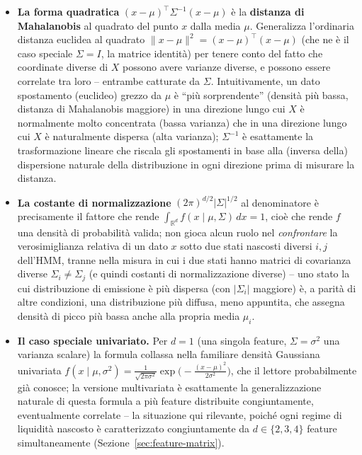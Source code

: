 \documentclass[11pt]{article}
\theoremstyle{definition}
\theoremstyle{remark}
\begin{document}
\begin{itemize}
    \item \textbf{La forma quadratica} $(x-\mu)^\top\Sigma^{-1}(x-\mu)$ \`e la \textbf{distanza di Mahalanobis} al quadrato del punto $x$ dalla media $\mu$. Generalizza l'ordinaria distanza euclidea al quadrato $\|x-\mu\|^2=(x-\mu)^\top(x-\mu)$ (che ne \`e il caso speciale $\Sigma=I$, la matrice identit\`a) per tenere conto del fatto che coordinate diverse di $X$ possono avere varianze diverse, e possono essere correlate tra loro -- entrambe catturate da $\Sigma$. Intuitivamente, un dato spostamento (euclideo) grezzo da $\mu$ \`e ``pi\`u sorprendente'' (densit\`a pi\`u bassa, distanza di Mahalanobis maggiore) in una direzione lungo cui $X$ \`e normalmente molto concentrata (bassa varianza) che in una direzione lungo cui $X$ \`e naturalmente dispersa (alta varianza); $\Sigma^{-1}$ \`e esattamente la trasformazione lineare che riscala gli spostamenti in base alla (inversa della) dispersione naturale della distribuzione in ogni direzione prima di misurare la distanza.
    \item \textbf{La costante di normalizzazione} $(2\pi)^{d/2}|\Sigma|^{1/2}$ al denominatore \`e precisamente il fattore che rende $\int_{\mathbb{R}^d}f(x\mid\mu,\Sigma)\,dx=1$, cio\`e che rende $f$ una densit\`a di probabilit\`a valida; non gioca alcun ruolo nel \emph{confrontare} la verosimiglianza relativa di un dato $x$ sotto due stati nascosti diversi $i,j$ dell'HMM, tranne nella misura in cui i due stati hanno matrici di covarianza diverse $\Sigma_i\ne\Sigma_j$ (e quindi costanti di normalizzazione diverse) -- uno stato la cui distribuzione di emissione \`e pi\`u dispersa (con $|\Sigma_i|$ maggiore) \`e, a parit\`a di altre condizioni, una distribuzione pi\`u diffusa, meno appuntita, che assegna densit\`a di picco pi\`u bassa anche alla propria media $\mu_i$.
    \item \textbf{Il caso speciale univariato.} Per $d=1$ (una singola feature, $\Sigma=\sigma^2$ una varianza scalare) la formula collassa nella familiare densit\`a Gaussiana univariata $f(x\mid\mu,\sigma^2)=\frac{1}{\sqrt{2\pi\sigma^2}}\exp\!\big(-\tfrac{(x-\mu)^2}{2\sigma^2}\big)$, che il lettore probabilmente gi\`a conosce; la versione multivariata \`e esattamente la generalizzazione naturale di questa formula a pi\`u feature distribuite congiuntamente, eventualmente correlate -- la situazione qui rilevante, poich\'e ogni regime di liquidit\`a nascosto \`e caratterizzato congiuntamente da $d\in\{2,3,4\}$ feature simultaneamente (Sezione~\ref{sec:feature-matrix}).
\end{itemize}
\end{document}
